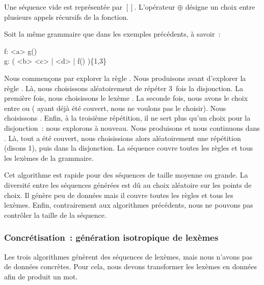 Une séquence vide est représentée par $[]$. L'opérateur $\oplus$ désigne un
choix entre plusieurs appels récursifs de la fonction.

\begin{example}
\label{example:data:coverage_based_generation}

Soit la même grammaire que dans les exemples précédents, à savoir~:

\begin{pre}
f: <a> g() \\
g: ( <b> <c> | <d> | f() )\{1,3\}
\end{pre}

Nous commençons par explorer la règle . Nous produisons  avant
d'explorer la règle . Là, nous choisissons aléatoirement de répéter
3~fois la disjonction. La première fois, nous choisissons le lexème .
La seconde fois, nous avons le choix entre  ou 
( ayant déjà été couvert, nous ne voulons pas le choisir). Nous
choisissons . Enfin, à la troisième répétition, il ne sert plus
qu'un choix pour la disjonction~: nous explorons  à nouveau. Nous
produisons  et nous continuons dans . Là, tout a été couvert,
nous choisissions alors aléatoirement une répétition (disons 1), puis 
dans la disjonction. La séquence  couvre toutes
les règles et tous les lexèmes de la grammaire.

\end{example}

Cet algorithme est rapide pour des séquences de taille moyenne ou grande. La
diversité entre les séquences générées est dû au choix aléatoire sur les points
de choix. Il génère peu de données mais il couvre toutes les règles et tous les
lexèmes. Enfin, contrairement aux algorithmes précédents, nous ne pouvons pas
contrôler la taille de la séquence.

\subsubsection{Concrétisation~: génération isotropique de lexèmes}
\label{subsection:data:isotropic_generation}

Les trois algorithmes génèrent des séquences de lexèmes, mais nous n'avons pas
de données concrètes. Pour cela, nous devons transformer les lexèmes en données
afin de produit un mot.


